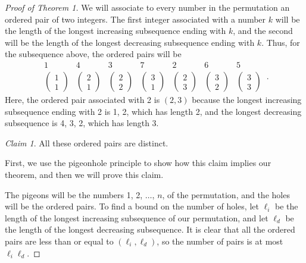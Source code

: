 \documentclass[11pt]{article}
\theoremstyle{plain}
\theoremstyle{definition}
\theoremstyle{remark}
\newtheorem*{claim}{Claim}
\begin{document}
\begin{proof}[Proof of Theorem 1]
We will associate to every number in the permutation an
ordered pair of two integers. The first integer associated with a number $k$
will be the length of the longest increasing subsequence ending with $k$,
and the second will be the length of the longest decreasing subsequence
ending with $k$. Thus, for the subsequence above, the ordered pairs will be
\[
\begin{array}{ccccccc}
1 & 4 & 3 & 7 & 2 & 6 & 5 \\
\left(\begin{array}{c}1\\1\end{array}\right) &
\left(\begin{array}{c}2\\1\end{array}\right) &
\left(\begin{array}{c}2\\2\end{array}\right) &
\left(\begin{array}{c}3\\1\end{array}\right) &
\left(\begin{array}{c}2\\3\end{array}\right) &
\left(\begin{array}{c}3\\2\end{array}\right) &
\left(\begin{array}{c}3\\3\end{array}\right) 
\end{array} \, .
\]
Here, the ordered pair associated with 2 is
$(2,3)$ because the longest increasing subsequence ending with 2 is 1, 2, which has
length 2, and the longest decreasing subsequence is 4, 3, 2, which has length 3.

\begin{claim}All these ordered pairs are distinct.
\end{claim}

First, we use the pigeonhole principle to show how this claim implies our theorem, and
then we will prove this claim. 

The pigeons will be 
the numbers 1, 2, $\ldots$, $n$, of the permutation, and the holes will be the 
ordered pairs.  To find a bound on the number of holes, let $\ell_i$ be the length of the longest increasing subsequence 
of our permutation, and let $\ell_d$ be the length of the longest decreasing
subsequence. It is clear that all the ordered pairs are less than or equal
to $(\ell_i,\ell_d)$, so the number of pairs is at most $\ell_i \ell_d$. 


\end{proof}
\end{document}
